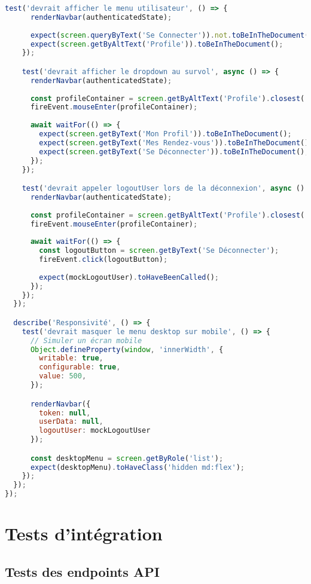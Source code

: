 \begin{lstlisting}[language=JavaScript, caption=Navbar.test.jsx]
    test('devrait afficher le menu utilisateur', () => {
      renderNavbar(authenticatedState);
      
      expect(screen.queryByText('Se Connecter')).not.toBeInTheDocument();
      expect(screen.getByAltText('Profile')).toBeInTheDocument();
    });

    test('devrait afficher le dropdown au survol', async () => {
      renderNavbar(authenticatedState);
      
      const profileContainer = screen.getByAltText('Profile').closest('div');
      fireEvent.mouseEnter(profileContainer);
      
      await waitFor(() => {
        expect(screen.getByText('Mon Profil')).toBeInTheDocument();
        expect(screen.getByText('Mes Rendez-vous')).toBeInTheDocument();
        expect(screen.getByText('Se Déconnecter')).toBeInTheDocument();
      });
    });

    test('devrait appeler logoutUser lors de la déconnexion', async () => {
      renderNavbar(authenticatedState);
      
      const profileContainer = screen.getByAltText('Profile').closest('div');
      fireEvent.mouseEnter(profileContainer);
      
      await waitFor(() => {
        const logoutButton = screen.getByText('Se Déconnecter');
        fireEvent.click(logoutButton);
        
        expect(mockLogoutUser).toHaveBeenCalled();
      });
    });
  });

  describe('Responsivité', () => {
    test('devrait masquer le menu desktop sur mobile', () => {
      // Simuler un écran mobile
      Object.defineProperty(window, 'innerWidth', {
        writable: true,
        configurable: true,
        value: 500,
      });

      renderNavbar({
        token: null,
        userData: null,
        logoutUser: mockLogoutUser
      });

      const desktopMenu = screen.getByRole('list');
      expect(desktopMenu).toHaveClass('hidden md:flex');
    });
  });
});
\end{lstlisting}

\section{Tests d'intégration}

\subsection{Tests des endpoints API}

